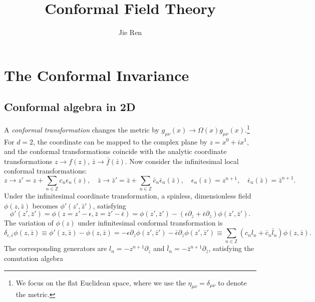 \documentclass[aps,prb,superscriptaddress,nofootinbib]{revtex4}
\begin{document}
\title{Conformal Field Theory}
\author{Jie Ren}


\maketitle


\tableofcontents

\section{The Conformal Invariance}


\subsection{Conformal algebra in 2D}
A \textit{conformal transformation} changes the metric by $g_{\mu\nu}(x) \rightarrow \Omega(x) g_{\mu\nu}(x)$.\footnote{We focus on the flat Euclidean space, where we use the $\eta_{\mu\nu} = \delta_{\mu\nu}$ to denote the metric.}
For $d=2$, the coordinate can be mapped to the complex plane by $z = x^0 + i x^1$, and the conformal transformations coincide with the analytic coordinate transformations $z \rightarrow f(z)$, $\bar z\rightarrow \bar f(\bar z)$.
Now consider the infinitesimal local conformal transformations:
\begin{equation}
	z \rightarrow z' = z + \sum_{n\in\mathbb Z} c_n \epsilon_n(z),\quad
	\bar z \rightarrow \bar z' = \bar z + \sum_{n\in\mathbb Z} \bar c_n \bar\epsilon_n(\bar z),\quad
	\epsilon_n(z) = z^{n+1},\quad 
	\bar\epsilon_n(\bar z) = \bar z^{n+1}.
\end{equation}
Under the infinitesimal coordinate transformation, a spinless, dimensionless field $\phi(z,\bar z)$ becomes $\phi'(z',\bar z')$, satisfying
\begin{equation}
	\phi'(z',\bar z') = \phi(z=z'-\epsilon,\bar z=\bar z'-\bar \epsilon) = \phi(z',\bar z')-(\epsilon\partial_{z}+\bar\epsilon\partial_{\bar z})\phi(z',\bar z').
\end{equation}
The variation of $\phi(z)$ under infinitesimal conformal transformation is
\begin{equation}
	\delta_{\epsilon,\bar\epsilon} \phi(z,\bar z)\equiv \phi'(z,\bar z)-\phi(z,\bar z) = -\epsilon\partial_{z}\phi(z',\bar z')-\bar\epsilon\partial_{\bar z}\phi(z',\bar z')
	\equiv \sum_{n\in \mathbb Z} \left(c_n l_n +\bar c_n \bar l_n\right)\phi(z,\bar z).
\end{equation}
The corresponding generators are $l_n = -z^{n+1}\partial_z$ and $\bar l_n = -\bar z^{n+1}\partial_{\bar z}$, satisfying the comutation algebra
\end{document}
